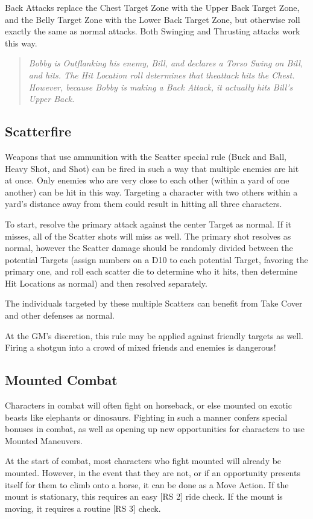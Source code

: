 \documentclass[oneside,11pt,english]{book}
\begin{document}
Back Attacks replace the Chest Target Zone with the Upper Back Target Zone, and the Belly Target Zone with the Lower Back Target Zone, but otherwise roll exactly the same as normal attacks. Both Swinging and Thrusting attacks work this way.
	\begin{quote}
		\emph{Bobby is Outflanking his enemy, Bill, and declares a Torso Swing on Bill, and hits. The Hit Location roll determines that theattack hits the Chest. However, because Bobby is making a Back Attack, it actually hits Bill’s Upper Back.}
	\end{quote}

\subsection{Scatterfire} %
Weapons that use ammunition with the Scatter special rule (Buck and Ball, Heavy Shot, and Shot) can be fired in such a way that multiple enemies are hit at once. Only enemies who are very close to each other (within a yard of one another) can be hit in this way. Targeting a character with two others within a yard’s distance away from them could result in hitting all three characters.

To start, resolve the primary attack against the center Target as normal. If it misses, all of the Scatter shots will miss as well. The primary shot resolves as normal, however the Scatter damage should be randomly divided between the potential Targets (assign numbers on a D10 to each potential Target, favoring the primary one, and roll each scatter die to determine who it hits, then determine Hit Locations as normal) and then resolved separately.

The individuals targeted by these multiple Scatters can benefit from Take Cover and other defenses as normal.

At the GM’s discretion, this rule may be applied against friendly targets as well. Firing a shotgun into a crowd of mixed friends and enemies is dangerous!

\subsection{Mounted Combat}
Characters in combat will often fight on horseback, or else mounted on exotic beasts like elephants or dinosaurs. Fighting in such a manner confers special bonuses in combat, as well as opening up new opportunities for characters to use Mounted Maneuvers.

At the start of combat, most characters who fight mounted will already be mounted. However, in the event that they are not, or if an opportunity presents itself for them to climb onto a horse, it can be done as a Move Action. If the mount is stationary, this requires an easy [RS 2] ride check. If the mount is moving, it requires a routine [RS 3] check.
\end{document}
